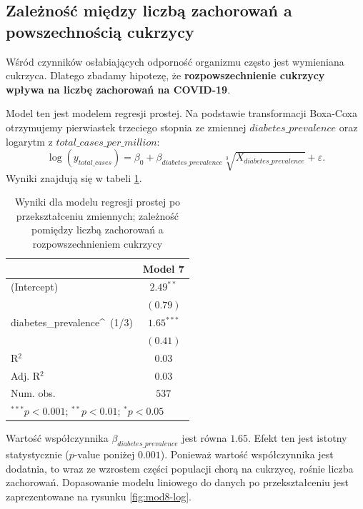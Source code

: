 \documentclass[12pt]{mwbk}
\theoremstyle{plain}
\theoremstyle{definition}
\theoremstyle{definition}
\newcommand\zrodlo[1]{\par\vspace{-3mm}{\small\textit{Źródło: }#1 }}
\begin{document}
\subsection{Zależność między liczbą zachorowań a powszechnością cukrzycy}

Wśród czynników osłabiających odporność organizmu często jest wymieniana cukrzyca. Dlatego zbadamy hipotezę, że \textbf{rozpowszechnienie cukrzycy wpływa na liczbę zachorowań na COVID-19}.

Model ten jest modelem regresji prostej. Na podstawie transformacji Boxa-Coxa otrzymujemy pierwiastek trzeciego stopnia ze zmiennej $diabetes\_prevalence$ oraz logarytm z $total\_cases\_per\_million$:
$$\log(y_{total\_cases})=\beta_0+\beta_{diabetes\_prevalence}\sqrt[3]{X_{diabetes\_prevalence}}+\varepsilon.$$
Wyniki znajdują się w tabeli \ref{table:mod8-log}.

\begin{table}[htbp]
	\begin{center}
			\caption{Wyniki dla modelu regresji prostej po przekształceniu zmiennych; zależność pomiędzy liczbą zachorowań a rozpowszechnieniem cukrzycy}
				
		\begin{tabular}{l c}
			\hline
			& Model 7 \\
			\hline
			(Intercept)                & $2.49^{**}$  \\
			& $(0.79)$     \\
			diabetes\_prevalence\^~(1/3) & $1.65^{***}$ \\
			& $(0.41)$     \\
			\hline
			R$^2$                      & $0.03$       \\
			Adj. R$^2$                 & $0.03$       \\
			Num. obs.                  & $537$        \\
			\hline
			\multicolumn{2}{l}{\scriptsize{$^{***}p<0.001$; $^{**}p<0.01$; $^{*}p<0.05$}}
		\end{tabular}
	
		\label{table:mod8-log}
		\vskip 0.5cm
	\zrodlo{Opracowanie własne} 
	\end{center}
\end{table}

Wartość współczynnika $\beta_{diabetes\_prevalence}$ jest równa $1.65$. Efekt ten jest istotny statystycznie ($p$-value poniżej $0.001$). Ponieważ wartość współczynnika jest dodatnia, to wraz ze wzrostem części populacji chorą na cukrzycę, rośnie liczba zachorowań. Dopasowanie modelu liniowego do danych po przekształceniu jest zaprezentowane na rysunku \ref{fig:mod8-log}.
\end{document}
